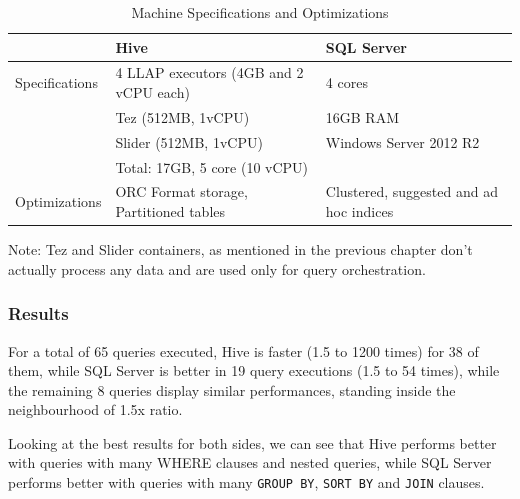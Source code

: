\begin{table}[!htb]
    \caption{Machine Specifications and Optimizations}
\begin{center}
    \begin{tabular}{|l|p{6cm}|p{5cm}|}
        \hline
        & Hive & SQL Server \\ \hline
        Specifications & 4 LLAP executors (4GB and 2 vCPU each) & 4 cores\\
        & Tez (512MB, 1vCPU) & 16GB RAM\\
        & Slider (512MB, 1vCPU) & Windows Server 2012 R2 \\
        & Total: 17GB, 5 core (10 vCPU) & \\ \hline    
        Optimizations & ORC Format storage, Partitioned tables & Clustered, suggested and ad hoc indices\\ \hline      
    \end{tabular}
\end{center}
\end{table}


Note: Tez and Slider containers, as mentioned in the previous chapter don't actually process any data and are used only for query orchestration.

\subsubsection{Results}

For a total of 65 queries executed, Hive is faster (1.5 to 1200 times) for 38 of them, while SQL Server is better in 19 query executions (1.5 to 54 times), while the remaining 8 queries display similar performances, standing inside the neighbourhood of 1.5x ratio.

Looking at the best results for both sides, we can see that Hive performs better with queries with many WHERE clauses and nested queries, while SQL Server performs better with queries with many \texttt{GROUP BY}, \texttt{SORT BY} and \texttt{JOIN} clauses.

